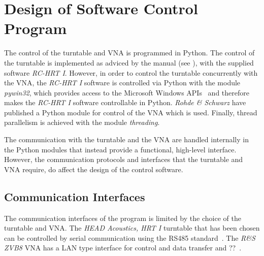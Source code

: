 \section{Design of Software Control Program}
The control of the turntable and VNA is programmed in Python. The control of the turntable is implemented as adviced by the manual (see \cite{hrt_i_manual}), with the supplied software \textit{RC-HRT I}. However, in order to control the turntable concurrently with the VNA, the \textit{RC-HRT I} software is controlled via Python with the module \textit{pywin32}, which provides access to the Microsoft Windows APIs~\cite{pywin32} and therefore makes the \textit{RC-HRT I} software controllable in Python. \textit{Rohde \& Schwarz} have published a Python module for control of the VNA which is used. Finally, thread parallelism is achieved with the module \textit{threading}.

The communication with the turntable and the VNA are handled internally in the Python modules that instead provide a functional, high-level interface. However, the communication protocols and interfaces that the turntable and VNA require, do affect the design of the control software. %

\subsection{Communication Interfaces}
The communication interfaces of the program is limited by the choice of the turntable and VNA. The \textit{HEAD Acoustics, HRT I} turntable that has been chosen can be controlled by serial communication using the RS485 standard~\cite{hrt_i_data_sheet}. The \textit{R\&S ZVB8} VNA has a LAN type interface for control and data transfer and ??~\cite{vna_data_sheet_descrip}.


